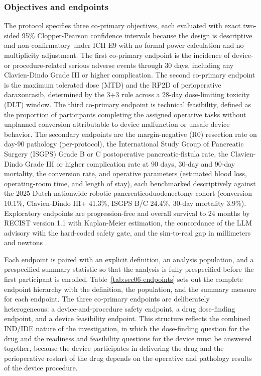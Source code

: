 \subsubsection*{Objectives and endpoints}

The protocol specifies three co-primary objectives, each evaluated with exact
two-sided 95\% Clopper-Pearson confidence intervals because the design is
descriptive and non-confirmatory under ICH E9 with no formal power calculation and
no multiplicity adjustment. The first co-primary endpoint is the incidence of
device- or procedure-related serious adverse events through 30 days, including any
Clavien-Dindo Grade III or higher complication. The second co-primary endpoint is
the maximum tolerated dose (MTD) and the RP2D of perioperative daraxonrasib,
determined by the 3+3 rule across a 28-day dose-limiting toxicity (DLT) window. The
third co-primary endpoint is technical feasibility, defined as the proportion of
participants completing the assigned operative tasks without unplanned conversion
attributable to device malfunction or unsafe device behavior. The secondary
endpoints are the margin-negative (R0) resection rate on day-90 pathology
(per-protocol), the International Study Group of Pancreatic Surgery (ISGPS) Grade B
or C postoperative pancreatic-fistula rate, the Clavien-Dindo Grade III or higher
complication rate at 90 days, 30-day and 90-day mortality, the conversion rate, and
operative parameters (estimated blood loss, operating-room time, and length of
stay), each benchmarked descriptively against the 2025 Dutch nationwide robotic
pancreaticoduodenectomy cohort (conversion 10.1\%, Clavien-Dindo III+ 41.3\%, ISGPS
B/C 24.4\%, 30-day mortality 3.9\%). Exploratory endpoints are progression-free and
overall survival to 24 months by RECIST version 1.1 with Kaplan-Meier estimation,
the concordance of the LLM advisory with the hard-coded safety gate, and the
sim-to-real gap in millimeters and newtons \cite{daraxwhipple,oncotrialllm}.

Each endpoint is paired with an explicit definition, an analysis population, and a
prespecified summary statistic so that the analysis is fully prespecified before the
first participant is enrolled. Table~\ref{tab:sec06-endpoints} sets out the complete
endpoint hierarchy with the definition, the population, and the summary measure for
each endpoint. The three co-primary endpoints are deliberately heterogeneous: a
device-and-procedure safety endpoint, a drug dose-finding endpoint, and a device
feasibility endpoint. This structure reflects the combined IND/IDE nature of the
investigation, in which the dose-finding question for the drug and the readiness and
feasibility questions for the device must be answered together, because the device
participates in delivering the drug and the perioperative restart of the drug depends
on the operative and pathology results of the device procedure.

